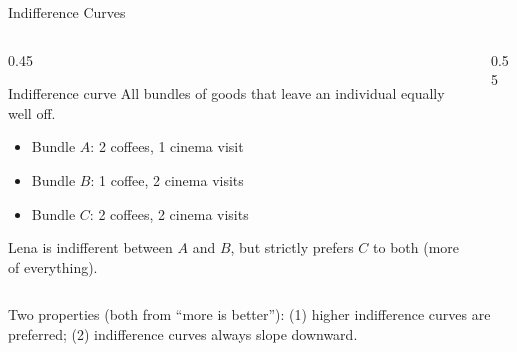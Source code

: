 \documentclass[11pt,aspectratio=169]{beamer}
\begin{document}
\begin{frame}{Indifference Curves}
  \footnotesize
  \begin{columns}[T]
    \begin{column}{0.45\textwidth}
      \begin{block}{Indifference curve}
        All bundles of goods that leave an individual equally well off.
      \end{block}
      \begin{itemize}
        \item Bundle $A$: 2 coffees, 1 cinema visit
        \item Bundle $B$: 1 coffee, 2 cinema visits
        \item Bundle $C$: 2 coffees, 2 cinema visits
      \end{itemize}
      Lena is indifferent between $A$ and $B$, but strictly prefers $C$ to both (more of everything).
    \end{column}
    \begin{column}{0.55\textwidth}
      \begin{center}
      \end{center}
    \end{column}
  \end{columns}
  Two properties (both from ``more is better''): (1) higher indifference curves are preferred; (2) indifference curves always slope downward.
\end{frame}
\end{document}
